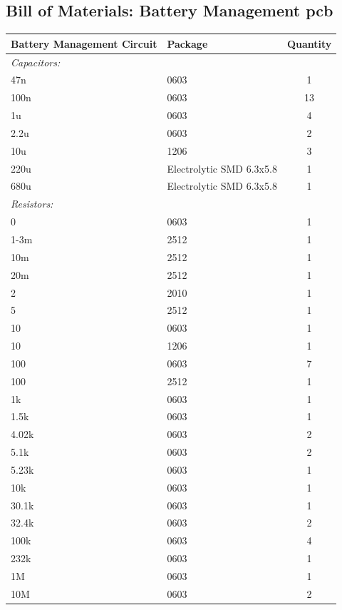 \subsection{Bill of Materials: Battery Management \gls{pcb}}
\begin{tabular}{|l|l|c|}
	\hline
	\bf{Battery Management Circuit} & \bf{Package} & \bf{Quantity} \\
	\hline
	\emph{Capacitors:} & & \\
	\hline
	47n & 0603 & 1 \\
	\hline
	100n & 0603 & 13 \\
	\hline
	1u & 0603 & 4 \\
	\hline
	2.2u & 0603 & 2 \\
	\hline
	10u & 1206 & 3 \\
	\hline
	220u & Electrolytic SMD 6.3x5.8 & 1 \\
	\hline
	680u & Electrolytic SMD 6.3x5.8 & 1 \\
	\hline
	\emph{Resistors:} & & \\
	\hline
	0 & 0603 & 1 \\
	\hline
	1-3m & 2512 & 1 \\
	\hline
	10m & 2512 & 1 \\
	\hline
	20m & 2512 & 1 \\
	\hline
	2 & 2010 & 1 \\
	\hline
	5 & 2512 & 1 \\
	\hline
	10 & 0603 & 1 \\
	\hline
	10 & 1206 & 1 \\
	\hline
	100 & 0603 & 7 \\
	\hline
	100 & 2512 & 1 \\
	\hline
	1k & 0603 & 1 \\
	\hline
	1.5k & 0603 & 1 \\
	\hline
	4.02k & 0603 & 2 \\
	\hline
	5.1k & 0603 & 2 \\
	\hline
	5.23k & 0603 & 1 \\
	\hline
	10k & 0603 & 1 \\
	\hline
	30.1k & 0603 & 1 \\
	\hline
	32.4k & 0603 & 2 \\
	\hline
	100k & 0603 & 4 \\
	\hline
	232k & 0603 & 1 \\
	\hline
	1M & 0603 & 1 \\
	\hline
	10M & 0603 & 2 \\
	\hline

\end{tabular}
